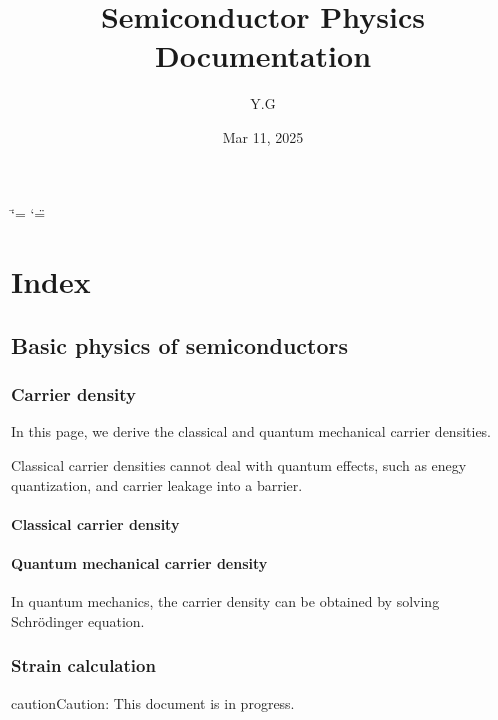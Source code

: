 \documentclass[letterpaper,10pt,english]{sphinxmanual}
\title{Semiconductor Physics Documentation}
\date{Mar 11, 2025}
\author{Y.G}
\numberwithin{equation}{section}
\begin{document}
\ifdefined\shorthandoff
  \ifnum\catcode`\=\string=\active\shorthandoff{=}\fi
  \ifnum\catcode`\"=\active{}\fi
\fi

\pagestyle{empty}
\sphinxmaketitle
\pagestyle{plain}
\sphinxtableofcontents
\pagestyle{normal}
\label{\detokenize{index::doc}}



\chapter{Index}
\label{\detokenize{index:index}}
\sphinxstepscope


\section{Basic physics of semiconductors}
\label{\detokenize{Basic_physics_of_semiconductors:basic-physics-of-semiconductors}}\label{\detokenize{Basic_physics_of_semiconductors::doc}}
\sphinxstepscope


\subsection{Carrier density}
\label{\detokenize{carrier_density:carrier-density}}\label{\detokenize{carrier_density::doc}}
\sphinxAtStartPar
In this page, we derive the classical and quantum mechanical carrier densities.

\sphinxAtStartPar
Classical carrier densities cannot deal with quantum effects, such as enegy quantization, and carrier leakage into a barrier.


\subsubsection{Classical carrier density}
\label{\detokenize{carrier_density:classical-carrier-density}}

\subsubsection{Quantum mechanical carrier density}
\label{\detokenize{carrier_density:quantum-mechanical-carrier-density}}
\sphinxAtStartPar
In quantum mechanics, the carrier density can be obtained by solving Schrödinger equation.

\sphinxstepscope


\subsection{Strain calculation}
\label{\detokenize{strain_calculation:strain-calculation}}\label{\detokenize{strain_calculation::doc}}
\begin{sphinxadmonition}{caution}{Caution:}
\sphinxAtStartPar
This document is in progress.
\end{sphinxadmonition}
\end{document}
